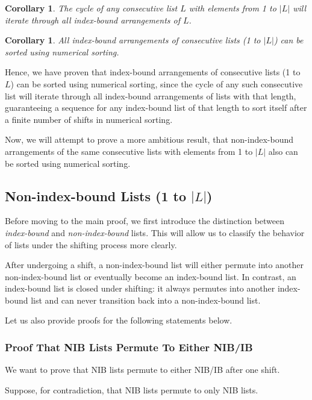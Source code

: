 \documentclass[12pt]{article}
\newtheorem{corollary}[theorem]{Corollary} %
\begin{document}
\begin{corollary}
 The cycle of any consecutive list $L$ with elements from 1 to $|L|$ will iterate through all index-bound arrangements of $L$.
\end{corollary}

\begin{corollary}
 All index-bound arrangements of consecutive lists (1 to $|L|$) can be sorted using numerical sorting.
\end{corollary}

Hence, we have proven that index-bound arrangements of consecutive lists (1 to $L$) can be sorted using numerical sorting, since the cycle of any such consecutive list will iterate through all index-bound arrangements of lists with that length, guaranteeing a sequence for any index-bound list of that length to sort itself after a finite number of shifts in numerical sorting.

Now, we will attempt to prove a more ambitious result, that non-index-bound arrangements of the same consecutive lists with elements from 1 to $|L|$ also can be sorted using numerical sorting.

\subsection{Non-index-bound Lists (1 to $|L|$)}

Before moving to the main proof, we first introduce the distinction between \emph{index-bound} and \emph{non-index-bound} lists. This will allow us to classify the behavior of lists under the shifting process more clearly.

After undergoing a shift, a non-index-bound list will either permute into another non-index-bound list or eventually become an index-bound list. In contrast, an index-bound list is closed under shifting: it always permutes into another index-bound list and can never transition back into a non-index-bound list.

Let us also provide proofs for the following statements below.

\subsubsection{Proof That NIB Lists Permute To Either NIB/IB}

We want to prove that NIB lists permute to either NIB/IB after one shift.

Suppose, for contradiction, that NIB lists permute to only NIB lists.
\end{document}
